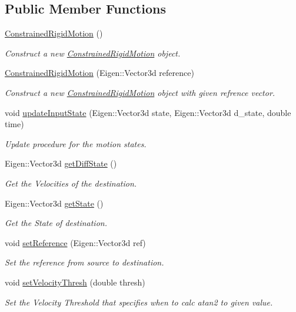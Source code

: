 \subsection*{Public Member Functions}
\begin{DoxyCompactItemize}
\item 
\hyperlink{group__RigidMotion_gaa85deb237e7407287829b6596997b210}{Constrained\+Rigid\+Motion} ()
\begin{DoxyCompactList}\small\item\em Construct a new \hyperlink{classConstrainedRigidMotion}{Constrained\+Rigid\+Motion} object. \end{DoxyCompactList}\item 
\hyperlink{group__RigidMotion_ga603d9727e46dc49dcf22b24870d15779}{Constrained\+Rigid\+Motion} (Eigen\+::\+Vector3d reference)
\begin{DoxyCompactList}\small\item\em Construct a new \hyperlink{classConstrainedRigidMotion}{Constrained\+Rigid\+Motion} object with given refrence vector. \end{DoxyCompactList}\item 
void \hyperlink{group__RigidMotion_ga80649fcba3aed41550ba463f405d051b}{update\+Input\+State} (Eigen\+::\+Vector3d state, Eigen\+::\+Vector3d d\+\_\+state, double time)
\begin{DoxyCompactList}\small\item\em Update procedure for the motion states. \end{DoxyCompactList}\item 
Eigen\+::\+Vector3d \hyperlink{group__RigidMotion_ga59bdced4bb2e565bc39312e5328507ef}{get\+Diff\+State} ()
\begin{DoxyCompactList}\small\item\em Get the Velocities of the destination. \end{DoxyCompactList}\item 
Eigen\+::\+Vector3d \hyperlink{group__RigidMotion_gabde902d2f91035cd5054a33dab4acc48}{get\+State} ()
\begin{DoxyCompactList}\small\item\em Get the State of destination. \end{DoxyCompactList}\item 
void \hyperlink{group__RigidMotion_gac71f6e395c1d63f54cfb837b5526236b}{set\+Reference} (Eigen\+::\+Vector3d ref)
\begin{DoxyCompactList}\small\item\em Set the reference from source to destination. \end{DoxyCompactList}\item 
void \hyperlink{group__RigidMotion_ga70771b8bb17cff0ffceadae49eab9f8e}{set\+Velocity\+Thresh} (double thresh)
\begin{DoxyCompactList}\small\item\em Set the Velocity Threshold that specifies when to calc atan2 to given value. \end{DoxyCompactList}\end{DoxyCompactItemize}
